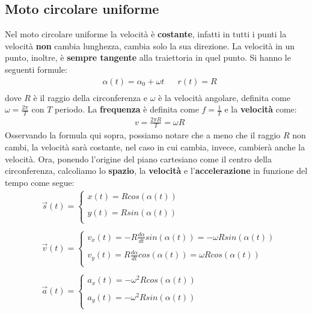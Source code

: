 			\subsection{Moto circolare uniforme}


				Nel moto circolare uniforme la velocità è \textbf{costante}, infatti in tutti i punti la velocità \textbf{non} cambia lunghezza, cambia solo la sua direzione. La velocità in un punto, inoltre, è \textbf{sempre tangente} alla traiettoria in quel punto.
				Si hanno le seguenti formule:
				\begin{align*}
					&\alpha(t)=\alpha_0 + \omega t
					&&r(t)=R\\
				\end{align*}
				dove $R$ è il raggio della circonferenza e $\omega$ è la velocità angolare, definita come $\omega=\frac{2\pi}{T}$ con $T$ periodo.
				La \textbf{frequenza} è definita come $f = \frac{1}{T}$ e la \textbf{velocità} come:
				\begin{align*}
					&v=\frac{2\pi R}{T}=\omega R
				\end{align*}
				Osservando la formula qui sopra, possiamo notare che a meno che il raggio $R$ non cambi, la velocità sarà costante, nel caso in cui cambia, invece, cambierà anche la velocità.
				Ora, ponendo l'origine del piano cartesiano come il centro della circonferenza, calcoliamo lo \textbf{spazio}, la \textbf{velocità} e l'\textbf{accelerazione} in funzione del tempo come segue:
				\begin{align*}
					&\vec{s}(t)=
					\begin{cases}
						x(t)=Rcos(\alpha(t))\\\\
						y(t)=Rsin(\alpha(t))\\
					\end{cases}\\\\
					&\vec{v}(t)=
					\begin{cases}
						v_x(t)=-R\frac{d\alpha}{dt}sin(\alpha(t))=-\omega Rsin(\alpha(t))\\\\
						v_y(t)=R\frac{d\alpha}{dt}cos(\alpha(t))=\omega Rcos(\alpha(t))\\
					\end{cases}\\\\
					&\vec{a}(t)=
					\begin{cases}
						a_x(t)=-\omega^2 Rcos(\alpha(t))\\\\
						a_y(t)=-\omega^2 Rsin(\alpha(t))\\
					\end{cases}\\
				\end{align*}

